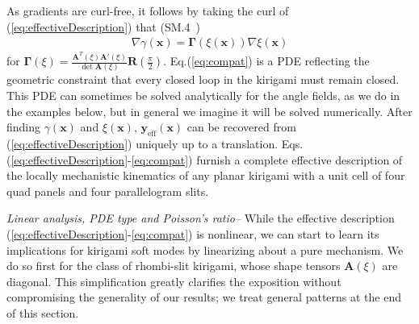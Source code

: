 \documentclass[aps,prl,twocolumn,superscriptaddress]{revtex4-1}
\begin{document}
As gradients are curl-free, it follows by taking the curl of (\ref{eq:effectiveDescription}) that (SM.4~\cite{suppl})
\begin{equation}
\begin{aligned}\label{eq:compat} 
 \nabla \gamma(\mathbf{x}) = \boldsymbol{\Gamma}(\xi(\mathbf{x})) \nabla \xi(\mathbf{x}) 
 \end{aligned}
 \end{equation}
 for  $\boldsymbol{\Gamma}(\xi) =  \frac{\mathbf{A}^T(\xi)\mathbf{A}'(\xi) }{\det \mathbf{A}(\xi)}  \mathbf{R}(\tfrac{\pi}{2})$.
Eq.\;(\ref{eq:compat}) is a PDE reflecting the  geometric constraint that every closed loop in the kirigami must remain closed. This PDE can sometimes be solved analytically for the angle fields, as we do in the examples below, but in general we imagine it will be solved numerically. After finding $\gamma(\mathbf{x})$ and $\xi(\mathbf{x})$,  $\mathbf{y}_{\text{eff}}(\mathbf{x})$ can be recovered from  (\ref{eq:effectiveDescription})  uniquely up to a translation.  Eqs.\;(\ref{eq:effectiveDescription}-\ref{eq:compat}) furnish a complete  effective description of the locally mechanistic kinematics of any planar kirigami with a unit cell of four quad panels and four parallelogram slits.
 
 


\textit{Linear analysis, PDE type and Poisson's ratio\;--} %
While the effective description (\ref{eq:effectiveDescription}-\ref{eq:compat}) is nonlinear, we can start to learn its implications for kirigami soft modes by linearizing about a pure mechanism. 
We do so first for the class of rhombi-slit kirigami, whose shape tensors $\mathbf{A}(\xi)$ are diagonal. This simplification greatly clarifies the exposition without compromising the generality of our results; we treat general patterns at the end of this section. %
 
\end{document}
